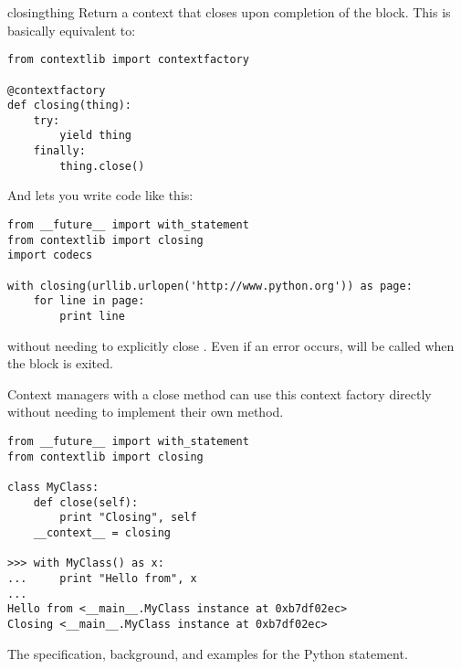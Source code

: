 \label{context-closing}
\begin{funcdesc}{closing}{thing}
Return a context that closes  upon completion of the
block.  This is basically equivalent to:

\begin{verbatim}
from contextlib import contextfactory

@contextfactory
def closing(thing):
    try:
        yield thing
    finally:
        thing.close()
\end{verbatim}

And lets you write code like this:
\begin{verbatim}
from __future__ import with_statement
from contextlib import closing
import codecs

with closing(urllib.urlopen('http://www.python.org')) as page:
    for line in page:
        print line
\end{verbatim}

without needing to explicitly close .  Even if an error
occurs,  will be called when the 
block is exited.

Context managers with a close method can use this context factory
directly without needing to implement their own
 method.
\begin{verbatim}
from __future__ import with_statement
from contextlib import closing

class MyClass:
    def close(self):
        print "Closing", self
    __context__ = closing

>>> with MyClass() as x:
...     print "Hello from", x
...
Hello from <__main__.MyClass instance at 0xb7df02ec>
Closing <__main__.MyClass instance at 0xb7df02ec>
\end{verbatim}
\end{funcdesc}

\begin{seealso}
         {The specification, background, and examples for the
          Python  statement.}
\end{seealso}
